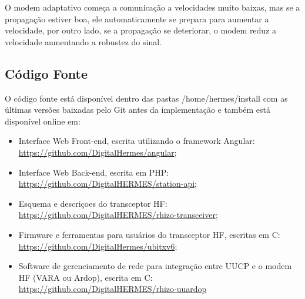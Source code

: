 \documentclass[11pt,a4paper]{article}
\begin{document}

O modem adaptativo começa a comunicação a velocidades muito baixas, mas se a propagação estiver boa, ele automaticamente se prepara para aumentar a velocidade, por outro lado, se a propagação se deteriorar, o modem reduz a velocidade aumentando a robustez do sinal. 
    
    

\subsection{Código Fonte}
\label{apx_src}

O código fonte está disponível dentro das pastas /home/hermes/install com as últimas versões baixadas pelo Git antes da implementação e também está disponível online em: 

\begin{itemize}
    \item Interface Web Front-end, escrita utilizando o framework Angular: \url{https://github.com/DigitalHermes/angular};
    \item Interface Web Back-end, escrita em PHP: \url{https://github.com/DigitalHERMES/station-api}; 
    \item Esquema e descriçoes do transceptor HF: \url{https://github.com/DigitalHERMES/rhizo-transceiver};
    \item Firmware e ferramentas para usuários do transceptor HF, escritas em C:
    \url{https://github.com/DigitalHermes/ubitxv6};
    \item Software de gerenciamento de rede para integração entre UUCP e o modem HF (VARA ou Ardop), escrita em C:
    \url{https://github.com/DigitalHERMES/rhizo-uuardop}
\end{itemize}
\end{document}
